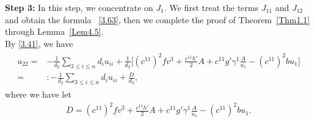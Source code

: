 \documentclass[11pt]{amsart}
\numberwithin{equation}{section}
\begin{document}
{\bf Step 3:}
In this step, we concentrate on $J_1$. We first treat the terms $J_{11}$ and $J_{12}$  and obtain the formula ~\eqref{3.63}, then we complete the proof of  Theorem~\ref{Thm1.1} through  Lemma~\ref{Lem4.5}.\\
 By \eqref{3.41}, we have
\begin{align}\label{3.59}
\begin{split}
u_{22}=&-\frac{1}{d_2}\sum_{3\leq i\leq n}d_iu_{ii}
+\frac{1}{d_2}\big[(c^{11})^2f v^3+\frac{c^{11}h'}{2} A+c^{11}g'\gamma^1\frac{A}{u_1}
-(c^{11})^2bu_1\big]\\
=&:-\frac{1}{d_2}\sum_{3\leq i\leq n}d_iu_{ii}
+\frac{D}{d_2},
\end{split}
\end{align}
where we have let
\begin{align}\label{3.59a}
D=(c^{11})^2f v^3+\frac{c^{11}h'}{2} A+c^{11}g'\gamma^1\frac{A}{u_1}
-(c^{11})^2bu_1.
\end{align}
\end{document}
